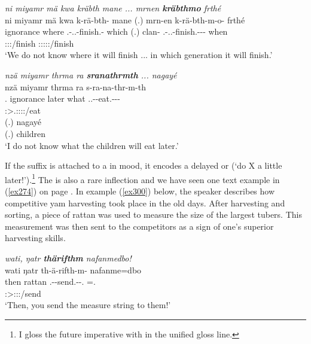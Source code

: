 \begin{exe}
	\ex \emph{ni miyamr mä kwa kräbth mane ... mrnen \textbf{kräbthmo} frthé}\\
	\glll ni miyamr mä kwa k-rä-bth-\Zero{} mane (.) mrn-en k-rä-bth-m-o-\Zero{} frthé\\
	\Fnsg{} ignorance where \Fut{} \M.\Bet-\Irr.\Vc.\Ndu-finish.\Rs-\Stsg{} which (.) clan-\Loc{} \M.\Bet-\Irr.\Vc.\Ndu-finish.\Rs-\Dur-\Andat-\Sg{} when\\
	{} {} {} {} \footnotesize{\Stsg:\Sbj:\Irr:\Pfv/finish} {} {} {} \footnotesize{\Sg:\Sbj:\Irr:\Pfv:\Bg:\Andat/finish} {}\\
	\trans `We do not know where it will finish ... in which generation it will finish.'\\
	\label{ex298}
\end{exe}
\begin{exe}
	\ex \emph{nzä miyamr thrma ra \textbf{sranathrmth} ... nagayé}\\
	\glll nzä miyamr thrma ra s-ra-na-thr-m-th\\
	\Fsg.\Abs{} ignorance later what \Tsg.\Masc.\Bet-\Irr-eat.\Ext-\Ndu-\Dur-\Stnsg{}\\
	{} {} {} {} \footnotesize{\Stpl:\Sbj>\Tsg.\Masc:\Obj:\Irr:\Ipfv:\Bg/eat}\\
	\sn
	\gll (.) nagayé\\
	(.) children\\
	\trans `I do not know what the children will eat later.'
	\label{ex299}
\end{exe}

If the  suffix is attached to a  in  mood, it encodes a delayed or   (`do X a little later!').\footnote{I gloss the future imperative with \Futimp{} in the unified gloss line.} The   is also a rare inflection and we have seen one text example in (\ref{ex274}) on page \pageref{ex274}. In example (\ref{ex300}) below, the speaker describes how competitive yam harvesting took place in the old days. After harvesting and sorting, a piece of rattan was used to measure the size of the largest tubers. This measurement was then sent to the competitors as a sign of one's superior harvesting skills.

\begin{exe}
 	\ex \emph{wati, ŋatr \textbf{thärifthm} nafanmedbo!}\\
 	\glll wati ŋatr th-ä-rifth-m-\Zero{} nafanme=dbo\\
 	then rattan \Stnsg.\Bet-\Ndu-send.\Rs-\Dur-\Ssg.\Imp{} \Tnsg=\All.\Sg{}\\
	{} {} \footnotesize{\Ssg:\Sbj>\Stpl:\Obj:\Futimp:\Pfv/send} {}\\
 	\trans `Then, you send the measure string to them!'
 	\label{ex300}
\end{exe}

